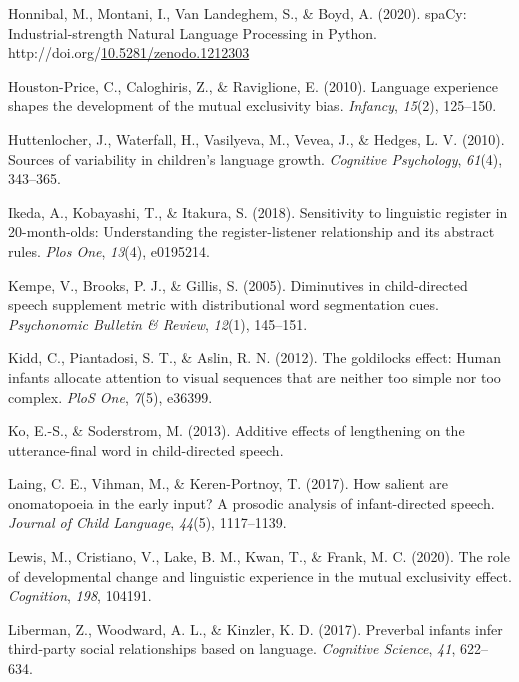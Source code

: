 \documentclass[10pt, letterpaper]{article}
\newenvironment{CSLReferences}%
  {}%
  {\par}
\begin{document}
\begin{CSLReferences}{1}{0}
\leavevmode\hypertarget{ref-honnibal2020spacy}{}%
Honnibal, M., Montani, I., Van Landeghem, S., \& Boyd, A. (2020).
{spaCy: Industrial-strength Natural Language Processing in Python}.
http://doi.org/\href{https://doi.org/10.5281/zenodo.1212303}{10.5281/zenodo.1212303}

\leavevmode\hypertarget{ref-houston2010language}{}%
Houston-Price, C., Caloghiris, Z., \& Raviglione, E. (2010). Language
experience shapes the development of the mutual exclusivity bias.
\emph{Infancy}, \emph{15}(2), 125--150.

\leavevmode\hypertarget{ref-huttenlocher2010sources}{}%
Huttenlocher, J., Waterfall, H., Vasilyeva, M., Vevea, J., \& Hedges, L.
V. (2010). Sources of variability in children's language growth.
\emph{Cognitive Psychology}, \emph{61}(4), 343--365.

\leavevmode\hypertarget{ref-ikeda2018sensitivity}{}%
Ikeda, A., Kobayashi, T., \& Itakura, S. (2018). Sensitivity to
linguistic register in 20-month-olds: Understanding the
register-listener relationship and its abstract rules. \emph{Plos One},
\emph{13}(4), e0195214.

\leavevmode\hypertarget{ref-kempe2005diminutives}{}%
Kempe, V., Brooks, P. J., \& Gillis, S. (2005). Diminutives in
child-directed speech supplement metric with distributional word
segmentation cues. \emph{Psychonomic Bulletin \& Review}, \emph{12}(1),
145--151.

\leavevmode\hypertarget{ref-kidd2012goldilocks}{}%
Kidd, C., Piantadosi, S. T., \& Aslin, R. N. (2012). The goldilocks
effect: Human infants allocate attention to visual sequences that are
neither too simple nor too complex. \emph{PloS One}, \emph{7}(5),
e36399.

\leavevmode\hypertarget{ref-ko2013additive}{}%
Ko, E.-S., \& Soderstrom, M. (2013). Additive effects of lengthening on
the utterance-final word in child-directed speech.

\leavevmode\hypertarget{ref-laing2017salient}{}%
Laing, C. E., Vihman, M., \& Keren-Portnoy, T. (2017). How salient are
onomatopoeia in the early input? A prosodic analysis of infant-directed
speech. \emph{Journal of Child Language}, \emph{44}(5), 1117--1139.

\leavevmode\hypertarget{ref-lewis2020role}{}%
Lewis, M., Cristiano, V., Lake, B. M., Kwan, T., \& Frank, M. C. (2020).
The role of developmental change and linguistic experience in the mutual
exclusivity effect. \emph{Cognition}, \emph{198}, 104191.

\leavevmode\hypertarget{ref-liberman2017preverbal}{}%
Liberman, Z., Woodward, A. L., \& Kinzler, K. D. (2017). Preverbal
infants infer third-party social relationships based on language.
\emph{Cognitive Science}, \emph{41}, 622--634.


\end{CSLReferences}
\end{document}
